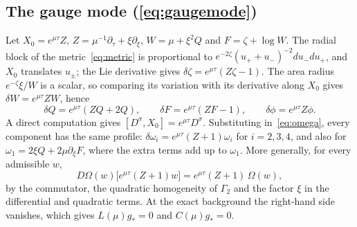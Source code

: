 \subsection{The gauge mode (\cref{eq:gaugemode})}\label{app:gauge}

Let $X_0=e^{\mu\tau}Z$, $Z=\mu^{-1}\partial_\tau+\xi\partial_\xi$, $W=\mu+\xi^2Q$ and $F=\zeta+\log W$. The radial
block of the metric~\eqref{eq:metric} is proportional to $e^{-2\zeta}(u_++u_-)^{-2}du_-du_+$, and $X_0$ translates
$u_\pm$; the Lie derivative gives $\delta\zeta=e^{\mu\tau}(Z\zeta-1)$. The area radius $e^{-\zeta}\xi/W$ is a scalar,
so comparing its variation with its derivative along $X_0$ gives $\delta W=e^{\mu\tau}ZW$, hence
\[
  \delta Q=e^{\mu\tau}(ZQ+2Q),\qquad \delta F=e^{\mu\tau}(ZF-1),\qquad \delta\phi=e^{\mu\tau}Z\phi .
\]
A direct computation gives $[D^\sigma,X_0]=e^{\mu\tau}D^\sigma$. Substituting in~\eqref{eq:omega}, every component
has the same profile: $\delta\omega_i=e^{\mu\tau}(Z+1)\omega_i$ for $i=2,3,4$, and also for $\omega_1=2\xi Q+2\mu\partial_\xi F$,
where the extra terms add up to $\omega_1$. More generally, for every admissible $w$,
\[
  D\Omega(w)\big[e^{\mu\tau}(Z+1)w\big]=e^{\mu\tau}(Z+1)\,\Omega(w),
\]
by the commutator, the quadratic homogeneity of $\Gamma_2$ and the factor $\xi$ in the differential and quadratic
terms. At the exact background the right-hand side vanishes, which gives $L(\mu)g_*=0$ and $C(\mu)g_*=0$.
